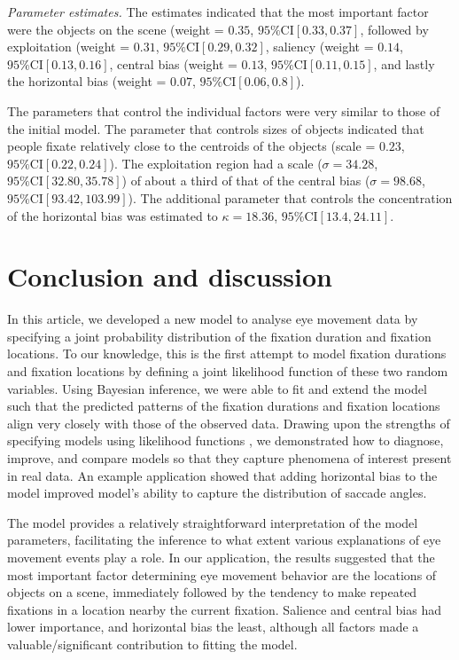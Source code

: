 \documentclass{article}
\begin{document}
\textit{Parameter estimates.} The estimates indicated that the most important factor were the objects on the scene (weight = $0.35$, $95\%\text{CI}[0.33, 0.37]$, followed by exploitation (weight = $0.31$, $95\%\text{CI}[0.29, 0.32]$, saliency (weight = $0.14$, $95\%\text{CI}[0.13, 0.16]$, central bias (weight = $0.13$, $95\%\text{CI}[0.11, 0.15]$, and lastly the horizontal bias (weight = $0.07$, $95\%\text{CI}[0.06, 0.8]$).

The parameters that control the individual factors were very similar to those of the initial model. The parameter that controls sizes of objects indicated that people fixate relatively close to the centroids of the objects (scale = $0.23$, $95\%\text{CI}[0.22, 0.24]$). The exploitation region had a scale ($\sigma = 34.28$, $95\%\text{CI}[32.80, 35.78]$) of about a third of that of the central bias ($\sigma=98.68$, $95\%\text{CI}[93.42, 103.99]$). The additional parameter that controls the concentration of the horizontal bias was estimated to $\kappa = 18.36$, $95\%\text{CI}[13.4,24.11]$.


\section{Conclusion and discussion}

In this article, we developed a new model to analyse eye movement data by specifying a joint probability distribution of the fixation duration and fixation locations. To our knowledge, this is the first attempt to model fixation durations and fixation locations by defining a joint likelihood function of these two random variables. Using Bayesian inference, we were able to fit and extend the model such that the predicted patterns of the fixation durations and fixation locations align very closely with those of the observed data. Drawing upon the strengths of specifying models using likelihood functions \citep{schutt2017likelihood}, we demonstrated how to diagnose, improve, and compare models so that they capture phenomena of interest present in real data. An example application showed that adding horizontal bias to the model improved model's ability to capture the distribution of saccade angles.

The model provides a relatively straightforward interpretation of the model parameters, facilitating the inference to what extent various explanations of eye movement events play a role. In our application, the results suggested that the most important factor determining eye movement behavior are the locations of objects on a scene, immediately followed by the tendency to make repeated fixations in a location nearby the current fixation. Salience and central bias had lower importance, and horizontal bias the least, although all factors made a valuable/significant contribution to fitting the model.
\end{document}
